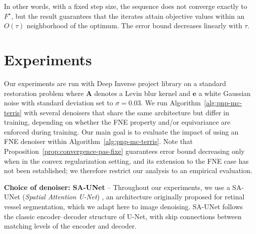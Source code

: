 \documentclass{article}
\newcommand{\Ab}{\mathbf{A}}
\newcommand{\eb}{\mathbf{e}}
\begin{document}
In other words, with a fixed step size, the sequence does not
converge exactly to $F^\star$, but 
the result guarantees that the iterates attain objective values within an \(O(\tau)\) neighborhood of the optimum.
The error bound decreases linearly with $\tau$.%
\vspace{-0.3cm}

\section{Experiments}
\label{sec:experiences}
\vspace{-0.2cm}

Our experiments are run with Deep Inverse
project library \cite{Tachella2025} on a standard restoration problem where $\Ab$ denotes a Levin blur kernel and $\eb$ a white Gaussian noise with standard deviation set to $\sigma = 0.03$.  We run Algorithm~\eqref{alg:pnp-mc-terris} with several denoisers that share the same architecture but differ in training, depending on whether the FNE property and/or equivariance are enforced during training. Our main goal is to evaluate the impact of using an FNE denoiser within Algorithm~\eqref{alg:pnp-mc-terris}. Note that Proposition~\ref{prop:convergence-pas-fixe} guarantees error bound decreasing only when in the convex regularization setting, and its extension to the FNE case has not been established; we therefore restrict our analysis to an empirical evaluation.

\noindent \textbf{Choice of denoiser: SA-UNet} -- Throughout our experiments, we use a SA-UNet
(\emph{Spatial Attention U-Net}) \cite{Guo2020SAUNet}, an architecture
originally proposed for retinal vessel segmentation, which we adapt
here to image denoising. SA-UNet follows the classic
encoder--decoder structure of U-Net, with skip connections between
matching levels of the encoder and decoder. %

\end{document}
